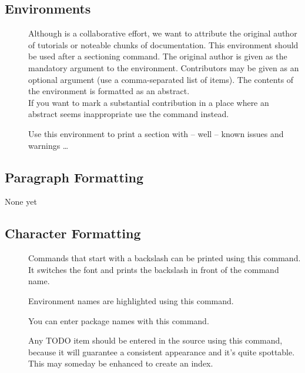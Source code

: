 \documentclass[openLilyLib_CG]{subfiles}
\begin{document}
\subsection{Environments}
\begin{description}
\item[] Although \openlilylib{} is a collaborative effort, we want to attribute the original author of tutorials or noteable chunks of documentation.
This environment should be used after a sectioning command.
The original author is given as the mandatory argument to the environment.
Contributors may be given as an optional argument (use a comma-separated list of  items).
The contents of the environment is formatted as an abstract.
\\
If you want to mark a substantial contribution in a place where an abstract seems inappropriate use the command  instead.
\item[] Use this environment to print a section with -- well -- known issues and warnings \dots
\end{description}

\subsection{Paragraph Formatting}
\begin{description}
\item[None yet]
\end{description}

\subsection{Character Formatting}

\begin{description}
\item[] Commands that start with a backslash can be printed using this command. It switches the font and prints the backslash in front of the command name.
\item[] Environment names are highlighted using this command.
\item[] You can enter package names with this command.
\item[] Any TODO item should be entered in the source using this command, because it will guarantee a consistent appearance and it's quite spottable.
This may someday be enhanced to create an index.
\end{description}
\end{document}
